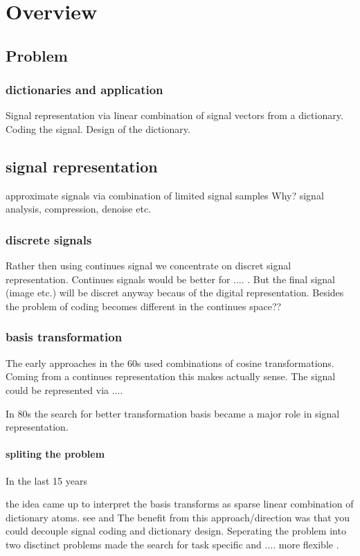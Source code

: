 \chapter{Overview}


\section{Problem}
\subsection{dictionaries and application}
Signal representation via linear combination of signal vectors from a dictionary.
Coding the signal. Design of the dictionary.

\section{signal representation}
approximate signals via combination of limited signal samples
Why?
signal analysis, compression, denoise etc.

\subsection{discrete signals}
Rather then using continues signal we concentrate on discret signal representation.
Continues signals would be better for .... . But the final signal (image etc.) will be discret anyway becaus of the 
digital representation. Besides the problem of coding becomes different in the continues space??

\subsection{basis transformation}
The early approaches in the 60s used combinations of cosine transformations. Coming from a continues representation this makes 
actually sense. The signal could be represented via ....

In 80s the search for better transformation basis became a major role in signal representation. \cite{}

\subsubsection{spliting the problem}
In the last 15 years 

the idea came up to interpret the basis transforms as sparse linear combination of dictionary atoms.
see \cite{Olshausen Field 1997} and \cite{}
The benefit from this approach/direction was that you could decouple signal coding and dictionary design.
Seperating the problem into two disctinct problems made the search for task specific and .... more flexible \cite{?}.


